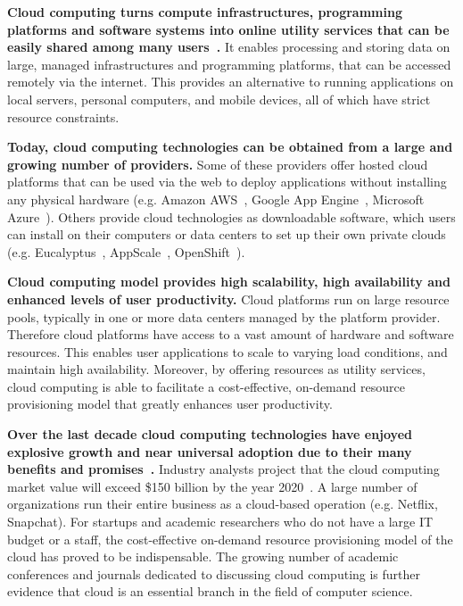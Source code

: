 \textbf{Cloud computing turns compute infrastructures, programming platforms and software systems
into online utility services that can be easily shared among many users~\cite{hassan2011demystifying,Mell:2011:SND:2206223}.}
It enables processing and storing data on large, managed infrastructures and 
programming platforms, that can be accessed remotely via the internet. This provides an
alternative to running applications on local servers, personal computers, and mobile devices,
all of which have strict resource constraints. 

\textbf{Today, cloud computing technologies can be obtained from a large and growing number of providers.}
Some of these providers offer hosted cloud platforms that can be used
via the web to deploy applications without installing any physical hardware 
(e.g. Amazon AWS~\cite{amazon-aws-web}, Google App Engine~\cite{gae}, Microsoft Azure~\cite{azure-web}). Others
provide cloud technologies as downloadable software, which users can install
on their computers or data centers to set up their own private clouds 
(e.g. Eucalyptus~\cite{eucalyptus09}, AppScale~\cite{6488671}, OpenShift~\cite{openshift}).

\textbf{Cloud computing model provides high scalability, high availability and enhanced levels of 
user productivity.} Cloud platforms run on large resource pools, typically in one or more
data centers managed by the platform provider. Therefore cloud platforms have access to a vast
amount of hardware and software resources. This enables user applications
to scale to varying load conditions, and maintain high availability. Moreover, by offering resources
as utility services, cloud computing is able to facilitate a cost-effective, on-demand
resource provisioning model that greatly enhances user productivity. 

\textbf{Over the last decade cloud computing technologies have enjoyed explosive growth 
and near universal adoption due to their many benefits and 
promises~\cite{Antonopoulos:2010:CCP:1855007,Pinheiro:2014:ACC:2618168.2618188}.} 
Industry analysts project that the cloud computing market value will exceed \$150 billion
by the year 2020~\cite{cloud-growth}.
A large number of organizations
run their entire business as a cloud-based operation (e.g. Netflix, Snapchat). For startups
and academic researchers who do not have a large IT budget or a staff, the cost-effective 
on-demand resource provisioning model of the cloud has proved to be indispensable.
The growing number of academic conferences and journals dedicated to discussing
cloud computing is further evidence that cloud is an essential branch in the field
of computer science.

